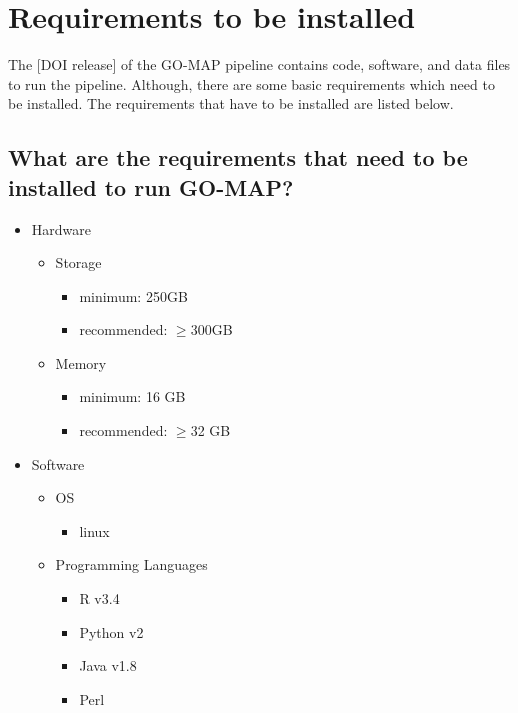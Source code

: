 \section{Requirements to be installed}
\label{sec:requirements}

The [DOI release] of the GO-MAP pipeline contains code, software, and data files to run the pipeline. Although, there are some basic requirements which need to be installed. The requirements that have to be installed are listed below.

\subsection{What are the requirements that need to be installed to run GO-MAP?}
\label{subsec:install_req}

\begin{itemize}
 \item Hardware
 \begin{itemize}
     \item Storage
     \begin{itemize}
         \item minimum: 250GB
         \item recommended: $\geq$300GB
     \end{itemize}
     \item Memory
     \begin{itemize}
         \item minimum: 16 GB
         \item recommended: $\geq$32 GB
     \end{itemize}
 \end{itemize}
 \item Software
 \begin{itemize}
     \item OS
     \begin{itemize}
         \item linux
     \end{itemize}
     
     \item Programming Languages
     \begin{itemize}
       \item R v3.4
       \item Python v2
       \item Java v1.8
       \item Perl
     \end{itemize}
    

\end{itemize}
\end{itemize}
